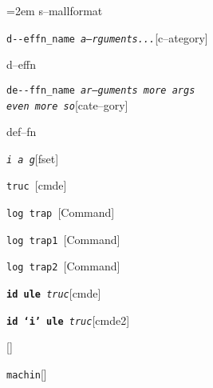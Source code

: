 \documentclass{book}
\begin{document}
\par\begingroup\obeylines\obeyspaces\frenchspacing\leftskip=2em\relax\parskip=0pt\relax\footnotesize{}%
s--mallformat
\endgroup{}%

\noindent\texttt{d{-}{-}effn\_name \EmbracOn{}\textnormal{\textsl{a--rguments...}}\EmbracOff{}}\hfill[c--ategory]



%
d--effn

\noindent\texttt{de{-}{-}ffn\_name \EmbracOn{}\textnormal{\textsl{ar--guments    more args \leavevmode{}\\ even more so}}\EmbracOff{}}\hfill[cate--gory]



%
def--fn

\noindent\texttt{\textsl{i} \EmbracOn{}\textnormal{\textsl{a g}}\EmbracOff{}}\hfill[fset]



%
%
\noindent\texttt{truc \EmbracOn{}\textnormal{\textsl{}}\EmbracOff{}}\hfill[cmde]



%
\noindent\texttt{log trap \EmbracOn{}\textnormal{\textsl{}}\EmbracOff{}}\hfill[Command]



%
\noindent\texttt{log trap1 \EmbracOn{}\textnormal{\textsl{}}\EmbracOff{}}\hfill[Command]



%
\noindent\texttt{log trap2 \EmbracOn{}\textnormal{\textsl{}}\EmbracOff{}}\hfill[Command]



%
\noindent\texttt{\textbf{id ule} \EmbracOn{}\textnormal{\textsl{truc}}\EmbracOff{}}\hfill[cmde]



%
\noindent\texttt{\textbf{id `\texttt{i}' ule} \EmbracOn{}\textnormal{\textsl{truc}}\EmbracOff{}}\hfill[cmde2]



%
\noindent\texttt{}\hfill[]



\noindent\texttt{machin}\hfill[]
\end{document}
